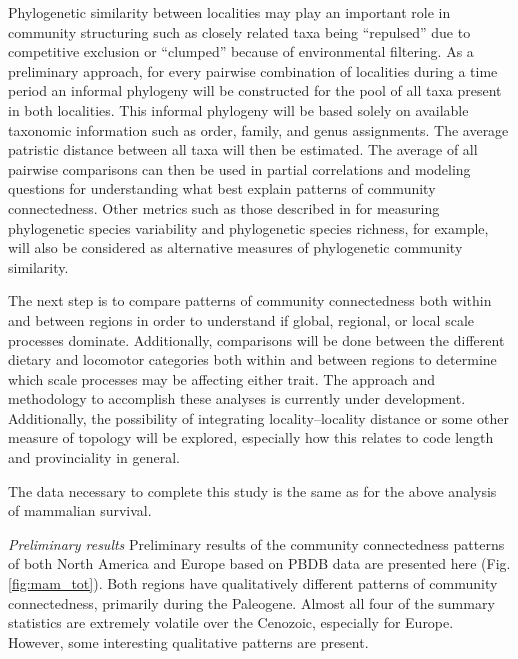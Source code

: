 \documentclass[12pt,letterpaper]{article}
\begin{document}
Phylogenetic similarity between localities may play an important role in community structuring \citep{Webb2002} such as closely related taxa being ``repulsed'' due to competitive exclusion or ``clumped'' because of environmental filtering. As a preliminary approach, for every pairwise combination of localities during a time period an informal phylogeny will be constructed for the pool of all taxa present in both localities. This informal phylogeny will be based solely on available taxonomic information such as order, family, and genus assignments. The average patristic distance between all taxa will then be estimated. The average of all pairwise comparisons can then be used in partial correlations and modeling questions for understanding what best explain patterns of community connectedness. Other metrics such as those described in \citet{Helmus2007a} for measuring phylogenetic species variability and phylogenetic species richness, for example, will also be considered as alternative measures of phylogenetic community similarity.

The next step is to compare patterns of community connectedness both within and between regions in order to understand if global, regional, or local scale processes dominate. Additionally, comparisons will be done between the different dietary and locomotor categories both within and between regions to determine which scale processes may be affecting either trait. The approach and methodology to accomplish these analyses is currently under development. Additionally, the possibility of integrating locality--locality distance or some other measure of topology will be explored, especially how this relates to code length and provinciality in general.

The data necessary to complete this study is the same as for the above analysis of mammalian survival.

\textit{Preliminary results}
Preliminary results of the community connectedness patterns of both North America and Europe based on PBDB data are presented here (Fig. \ref{fig:mam_tot}). Both regions have qualitatively different patterns of community connectedness, primarily during the Paleogene. Almost all four of the summary statistics are extremely volatile over the Cenozoic, especially for Europe. However, some interesting qualitative patterns are present.
\end{document}
